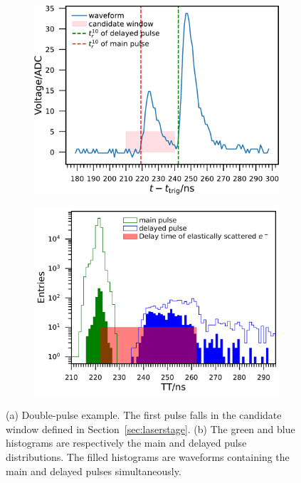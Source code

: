 \begin{figure}[!htbp]
    \centering
    \begin{subfigure}[t]{\SF\textwidth}
        \includegraphics[width=\textwidth]{figures/method/triggerDoublePulse.pdf}
        \caption{}%
        \label{fig:triggerTT2pulse}
    \end{subfigure}
    \begin{subfigure}[t]{\SF\textwidth}
        \includegraphics[width=\textwidth]{figures/method/triggerDelayedPulse.pdf}
        \caption{}%
        \label{fig:triggerTTlatepulse}
    \end{subfigure}
    \caption{(a) Double-pulse example. The first pulse falls in the candidate window defined in Section~\ref{sec:laserstage}. (b) The green and blue histograms are respectively the main and delayed pulse distributions. The filled histograms are waveforms containing the main and delayed pulses simultaneously.}
\end{figure}

